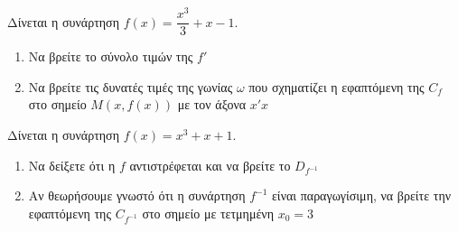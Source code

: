 \documentclass{presentation}
\begin{document}
\begin{askisi}
  Δίνεται η συνάρτηση $f(x)=\dfrac{x^3}{3}+x-1$.
  \begin{enumerate}
    \item<1-> Να βρείτε το σύνολο τιμών της $f'$
    \item<2-> Να βρείτε τις δυνατές τιμές της γωνίας $ω$ που σχηματίζει η εφαπτόμενη της $C_f$ στο σημείο $Μ(x,f(x))$ με τον άξονα $x'x$
  \end{enumerate}

\end{askisi}

\begin{askisi}
  Δίνεται η συνάρτηση $f(x)=x^3+x+1$.
  \begin{enumerate}
    \item<1-> Να δείξετε ότι η $f$ αντιστρέφεται και να βρείτε το $D_{f^{-1}}$
    \item<2-> Αν θεωρήσουμε γνωστό ότι η συνάρτηση $f^{-1}$ είναι παραγωγίσιμη, να βρείτε την εφαπτόμενη της $C_{f^{-1}}$ στο σημείο με τετμημένη $x_0=3$
  \end{enumerate}


\end{askisi}

\moodle
\end{document}
